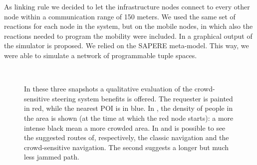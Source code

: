 \documentclass[12pt,a4paper,twoside,openright]{book}
\begin{document}
As linking rule we decided to let the infrastructure nodes connect to every other node within a communication range of 150 meters. 
%
We used the same set of reactions for each node in the system, but on the mobile nodes, in which also the reactions needed to program the mobility were included.
%
In  a graphical output of the simulator is proposed.
%
We relied on the SAPERE meta-model.
%
This way, we were able to simulate a network of programmable tuple spaces.

\begin{figure}
~
~
 \caption{In these three snapshots a qualitative evaluation of the crowd-sensitive steering system benefits is offered. The requester is painted in red, while the nearest POI is in blue. In , the density of people in the area is shown (at the time at which the red node starts): a more intense black mean a more crowded area. In  and  is possible to see the suggested routes of, respectively, the classic navigation and the crowd-sensitive navigation. The second suggests a longer but much less jammed path.}
 \label{img:ahpc-steering}
\end{figure}
\end{document}
